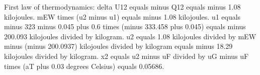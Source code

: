 First law of thermodynamics: delta U12 equals minus Q12 equals minus 1.08 kilojoules.  
mEW times (u2 minus u1) equals minus 1.08 kilojoules.  
u1 equals minus 323 minus 0.045 plus 0.6 times (minus 333.458 plus 0.045) equals minus 200.093 kilojoules divided by kilogram.  
u2 equals 1.08 kilojoules divided by mEW minus (minus 200.0937) kilojoules divided by kilogram equals minus 18.29 kilojoules divided by kilogram.  
x2 equals u2 minus uF divided by uG minus uF times (aT plus 0.03 degrees Celsius) equals 0.05686.